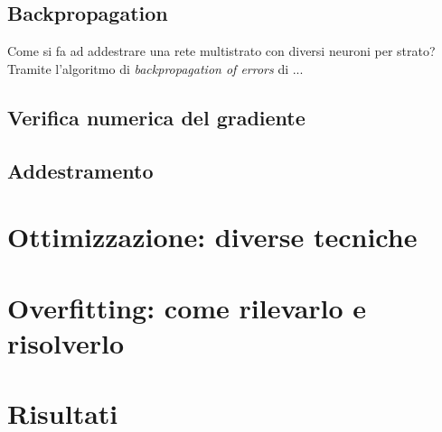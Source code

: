 \subsection{Backpropagation}
Come si fa ad addestrare una rete multistrato con diversi neuroni per strato? Tramite l'algoritmo di \emph{backpropagation of errors} di ... 
\subsection{Verifica numerica del gradiente}
\subsection{Addestramento}


\section{Ottimizzazione: diverse tecniche}


\section{Overfitting: come rilevarlo e risolverlo}




\section{Risultati}

